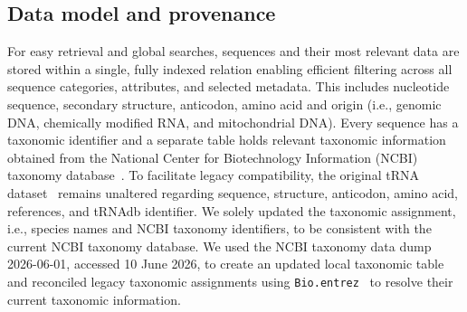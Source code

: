 \documentclass[unnumsec,webpdf,contemporary,large]{oup-authoring-template}
\newcommand{\TODO}[1]{\begingroup\color{red}#1\endgroup}
\newcommand{\OLD}[1]{\begingroup\color{gray}\scriptsize #1\endgroup}
\begin{document}
%

\subsection{Data model and provenance}

For easy retrieval and global searches, sequences and their most relevant
data are stored within a single, fully indexed relation enabling efficient
filtering across all sequence categories, attributes, and selected
metadata. This includes nucleotide sequence, secondary structure,
anticodon, amino acid and origin (i.e., genomic DNA, chemically modified RNA, and mitochondrial DNA). Every sequence has a taxonomic identifier and a separate table holds relevant taxonomic information obtained from the National Center for Biotechnology Information (NCBI) taxonomy database~\cite{ncbitaxonomy2020}. To facilitate legacy compatibility, the original tRNA dataset~\cite{juehling:2009} remains unaltered regarding sequence, structure, anticodon, amino acid, references, and tRNAdb identifier. We solely updated the taxonomic assignment, i.e., species names and NCBI taxonomy identifiers, to be consistent with the current NCBI taxonomy database. We used the NCBI taxonomy data dump 2026-06-01, accessed 10 June 2026, to create an updated local taxonomic table and reconciled legacy taxonomic assignments using \texttt{Bio.entrez}~\cite{biopython2009} to resolve their current taxonomic information.
\end{document}
